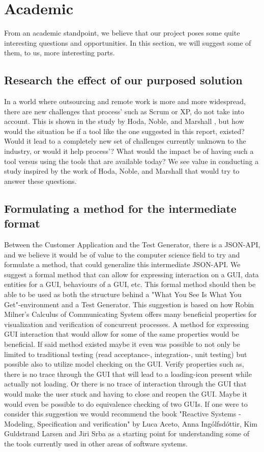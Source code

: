\section{Academic}
From an academic standpoint, we believe that our project poses some quite interesting questions and opportunities.
In this section, we will suggest some of them, to us, more interesting parts.

\subsection{Research the effect of our purposed solution}
In a world where outsourcing and remote work is more and more widespread, there are new challenges that process' such as Scrum or XP, do not take into account.
This is shown in the study by Hoda, Noble, and Marshall \cite{Hoda2011TheIO}, but how would the situation be if a tool like the one suggested in this report, existed?
Would it lead to a completely new set of challenges currently unknown to the industry, or would it help process'?
What would the impact be of having such a tool versus using the tools that are available today?
We see value in conducting a study inspired by the work of Hoda, Noble, and Marshall that would try to answer these questions.

\subsection{Formulating a method for the intermediate format}
Between the Customer Application and the Test Generator, there is a JSON-API, and we believe it would be of value to the computer science field to try and formulate a method, that could generalize this intermediate JSON-API.
We suggest a formal method that can allow for expressing interaction on a GUI, data entities for a GUI, behaviours of a GUI, etc.
This formal method should then be able to be used as both the structure behind a "What You See Is What You Get"-environment and a Test Generator.
This suggestion is based on how Robin Milner's Calculus of Communicating System offers many beneficial properties for visualization and verification of concurrent processes.
A method for expressing GUI interaction that would allow for some of the same properties would be beneficial.
If said method existed maybe it even was possible to not only be limited to traditional testing (read acceptance-, integration-, unit testing) but possible also to utilize model checking on the GUI.
Verify properties such as, there is no trace through the GUI that will lead to a loading-icon present while actually not loading.
Or there is no trace of interaction through the GUI that would make the user stuck and having to close and reopen the GUI.
Maybe it would even be possible to do equivalence checking of two GUIs.
If one were to consider this suggestion we would recommend the book "Reactive Systems - Modeling, Specification and verification" by Luca Aceto, Anna Ingólfsdóttir, Kim Guldstrand Larsen and Jiri Srba as a starting point for understanding some of the tools currently used in other areas of software systems.

